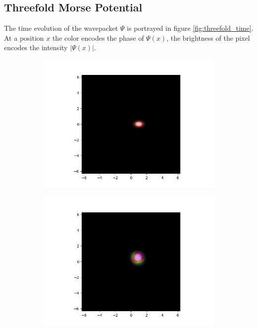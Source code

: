 \documentclass{article}
\begin{document}
\begin{appendices}
\subsection{Threefold Morse Potential}
The time evolution of the wavepacket $\Psi$ is portrayed in figure \ref{fig:threefold_time}. At a position $x$ the color encodes the phase of $\Psi(x)$, the brightness of the pixel encodes the intensity $\lvert \Psi(x) \rvert$.
\begin{figure}[h]
  \begin{subfigure}[b]{0.5 \textwidth}
    \includegraphics[width = \textwidth]{graphics/threefold_morse/wavefunction_contour_block_0_level_0_timestep_0000000.PNG}
  \end{subfigure}
  \hfill
  \begin{subfigure}[b]{0.5 \textwidth}
    \includegraphics[width = \textwidth]{graphics/threefold_morse/wavefunction_contour_block_0_level_0_timestep_0000100.PNG}

\end{subfigure}
\end{figure}
\end{appendices}
\end{document}
